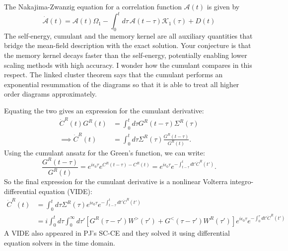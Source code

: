 \begin{tcolorbox}[colback=orange!5!white, colframe=orange!75!black, title=COMPARISON]
The Nakajima-Zwanzig equation for a correlation function $\mathcal{A}(t)$ is given by
\begin{equation}
\dot{\mathcal{A}}(t) = \mathcal{A}(t) {\Omega_1} - \int_{0}^{t} d \tau\, \mathcal{A}(t - \tau) \mathcal{K}_1(\tau) + D(t)
\label{eq:GQME}
\end{equation}
The self-energy, cumulant and the memory kernel are all auxiliary quantities that bridge the mean-field description with the exact solution. Your conjecture is that the memory kernel decays faster than the self-energy, potentially enabling lower scaling methods with high accuracy. I wonder how the cumulant compares in this respect. The linked cluster theorem says that the cumulant performs an exponential resummation of the diagrams so that it is able to treat all higher order diagrams approximately.
\end{tcolorbox}
Equating the two gives an expression for the cumulant derivative:
\begin{align}
\dot{C}^R(t)G^R(t) &= \int_0^t d \tau G^R(t-\tau) \Sigma^R(\tau)\\
\implies \dot{C}^R(t) &= \int_0^t d \tau \Sigma^R(\tau) \frac{G^R(t-\tau)}{G^R(t)} .
\end{align}
Using the cumulant ansatz for the Green's function, we can write:
\begin{equation}
    \frac{G^R(t-\tau)}{G^R(t)}=e^{i \epsilon_0 \tau} e^{C^R(t-\tau)-C^R(t)} = e^{i \epsilon_0 \tau} e^{-\int_{t-\tau}^t d t' \dot{C}^R(t')} .
\end{equation}
So the final expression for the cumulant derivative is a nonlinear Volterra integro-differential equation (VIDE):
\begin{align}
    \dot{C}^R(t)&=\int_0^t d \tau \Sigma^R(\tau) e^{i \epsilon_0 \tau} e^{-\int_{t-\tau}^t d t' \dot{C}^R(t')} \\
    &=i\int_0^t d \tau \int_0^{\infty} d \tau' \left[G^R(\tau - \tau') W^{>}(\tau')+G^{<}(\tau-\tau') W^R(\tau')\right] e^{i \epsilon_0 \tau} e^{-\int_0^\tau d t' \dot{C}^R(t')} 
\end{align}
A VIDE also appeared in PJ's SC-CE and they solved it using differential equation solvers in the time domain.

